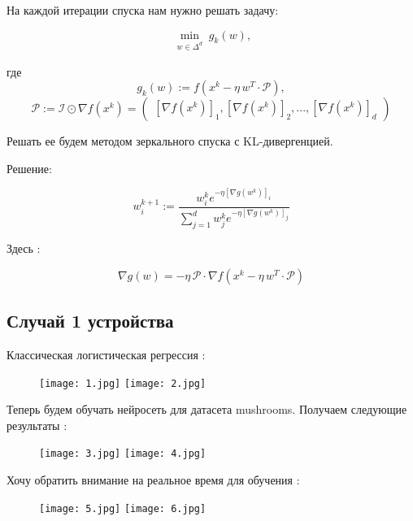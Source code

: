 \documentclass[12pt, twoside]{article}
\begin{document}
На каждой итерации спуска нам нужно решать задачу:

$$\min_{\substack{w \in \Delta^d}} g_k(w),$$

где
$$g_k(w) := f \left(x^k - \eta \, w^T \cdot \mathcal{P} \right),$$
$$\mathcal{P} := \mathcal{I} \odot \nabla f\left(x^k \right) =
    \begin{pmatrix}
           \left[\nabla f\left(x^k \right)\right]_1, \left[\nabla f\left(x^k \right)\right]_2, ..., \left[\nabla f\left(x^k \right)\right]_d
     \end{pmatrix}$$

Решать ее будем методом зеркального спуска с KL-дивергенцией.

Решение:

$$w_i^{k+1} := \frac{w_i^k e^{-\eta \left[ \nabla g(w^k)\right]_i}}{\sum\limits_{j=1}^{d} w_j^k e^{-\eta \left[ \nabla g(w^k) \right]_j}}$$

Здесь :

$$\nabla g(w) = -\eta \, \mathcal{P} \cdot \nabla f\left(x^k - \eta \, w^T \cdot \mathcal{P} \right)$$
\subsection{Случай 1 устройства}
Классическая логистическая регрессия :
\begin{figure}[H]
\centering
{}
  {\texttt{[image: 1.jpg]}}
  {\texttt{[image: 2.jpg]}}
\label{exper1_main}
\end{figure}

Теперь будем обучать нейросеть для датасета mushrooms. Получаем следующие результаты :
\begin{figure}[H]
\centering
{}
  {\texttt{[image: 3.jpg]}}
  {\texttt{[image: 4.jpg]}}
\label{exper1_main}
\end{figure}

Хочу обратить внимание на реальное время для обучения :
\begin{figure}[H]
\centering
{}
  {\texttt{[image: 5.jpg]}}
  {\texttt{[image: 6.jpg]}}
\label{exper1_main}
\end{figure}
\end{document}
